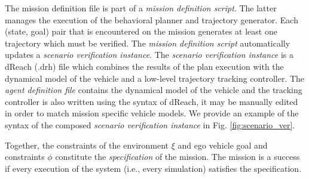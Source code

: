The mission definition file is part of a \emph{mission definition script}.
The latter manages the execution of the behavioral planner and trajectory generator.
Each (state, goal) pair that is encountered on the mission generates at least one trajectory which must be verified. The \emph{mission definition script} automatically updates a \emph{scenario verification instance}. The \emph{scenario verification instance} is a dReach (.drh) file which combines the results of the plan execution with the dynamical model of the vehicle and a low-level trajectory tracking controller. The \emph{agent definition file} contains the dynamical model of the vehicle and the tracking controller is also written using the syntax of dReach, it may be manually edited in order to match mission specific vehicle models. We provide an example of the syntax of the composed \emph{scenario verification instance} in Fig. \ref{fig:scenario_ver}.


Together, the constraints of the environment $\xi$ and ego vehicle goal and constraints $\phi$ constitute the \emph{specification} of the mission.
The mission is a success if every execution of the system (i.e., every simulation) satisfies the specification.

